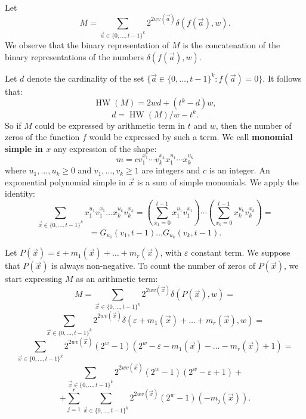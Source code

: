 \documentclass[10pt,a4paper]{article}
\theoremstyle{plain}
\newcommand{\HW}{\operatorname{HW}}
\begin{document}
Let $$ M  = \sum_{\vec{a} \in \{ 0 , \dots , t  - 1 \}^k} 2^{2 w  v ( \vec{a} )} \delta ( f (\vec{a} ) , w ) . $$
We observe that the binary representation of $M$ is the concatenation of the binary representations of the numbers $\delta(f(\vec a), w)$.

Let $ d $ denote the cardinality of the set $ \{ \vec{a} \in \{ 0 , \dots , t - 1 \}^k : f ( \vec{a} ) = 0 \} $. It follows that:
$$\HW(M) = 2wd + (t^k - d)w, $$
$$d =\HW(M) / w - t^k. $$
So if $M$ could be expressed by arithmetic term in $t$ and $w$, then the number of zeros of the function $f$ would be expressed by such a term. We call {\bf monomial simple in $x$} any expression of the shape:
$$m = c v_1^{x_1} \cdots v_k^{x_k} x_1^{u_1} \cdots x_k^{u_k}$$
where $u_1, \dots, u_k \geq 0$ and $v_1, \dots, v_k \geq 1$ are integers and $c$ is an integer. An exponential polynomial simple in $\vec x$ is a sum of simple monomials. We apply the identity: 
$$ \sum_{\vec{x} \in \{ 0 , \dots , t - 1 \}^k} x_1^{u_1} v_1^{x_1} \dots x_k^{u_k} v_k^{x_k} = \left ( \sum _{x_1 = 0}^{t-1} x_1^{u_1} v_1^{x_1} \right ) \cdots \left ( \sum _{x_k = 0}^{t-1} x_k^{u_k} v_k^{x_k} \right ) =$$ $$ = G_{u_1} ( v_1 , t - 1 ) \dots G_{u_k} ( v_k , t - 1 ) . $$ 

Let $P(\vec x) = \varepsilon  + m_1 (  \vec{x} ) + \dots + m_r (  \vec{x} )$, with $\varepsilon$ constant term. We suppose that $P(\vec x)$ is always non-negative. To count the number of zeros of $P(\vec x)$, we start expressing $M$ as an arithmetic term:
 $$ M = \sum_{\vec{x} \in \{ 0 , \dots , t  - 1 \}^k} 2^{2 w  v ( \vec{x} )} \delta ( P (  \vec{x} ) , w  ) = $$ $$ \sum_{\vec{x} \in \{ 0 , \dots , t  - 1 \}^k} 2^{2 w  v ( \vec{x} )} \delta ( \varepsilon  + m_1 (  \vec{x} ) + \dots + m_r (  \vec{x} ) , w  ) = $$ $$ \sum_{\vec{x} \in \{ 0 , \dots , t  - 1 \}^k} 2^{2 w  v ( \vec{x} )} ( 2^{w } - 1 ) ( 2^{w } - \varepsilon  - m_1 (  \vec{x} ) - \dots - m_r (  \vec{x} ) + 1 ) = $$ $$ \sum_{\vec{x} \in \{ 0 , \dots , t  - 1 \}^k} 2^{2 w  v ( \vec{x} )} ( 2^{w } - 1 ) ( 2^{w } - \varepsilon + 1 ) + $$ $$ + \sum_{j = 1}^r \sum_{\vec{x} \in \{ 0 , \dots , t  - 1 \}^k} 2^{2 w  v ( \vec{x} )} ( 2^{w } - 1 ) ( - m_j (  \vec{x} ) ) . $$
\end{document}

